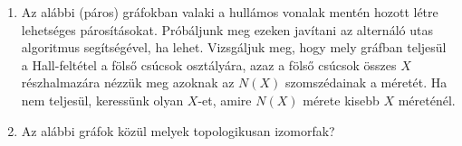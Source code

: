 \documentclass[a4paper, 12pt]{article}
\begin{document}
\begin{enumerate}
            \hrule
            \item Az alábbi (páros) gráfokban valaki a hullámos vonalak mentén hozott létre lehetséges párosításokat. Próbáljunk meg ezeken javítani az alternáló utas algoritmus segítségével, ha lehet. Vizsgáljuk meg, hogy mely gráfban teljesül a Hall-feltétel a fölső csúcsok osztályára, azaz a fölső csúcsok összes $X$ részhalmazára nézzük meg azoknak az $N(X)$ szomszédainak a méretét. Ha nem teljesül, keressünk olyan $X$-et, amire $N(X)$ mérete kisebb $X$ méreténél.
            \begin{figure}[ht]
                \centering
                \begin{subfigure}{0.3\textwidth}
                    \centering
                    
                \end{subfigure}
                \begin{subfigure}{0.3\textwidth}
                    \centering
                    
                \end{subfigure}
                \begin{subfigure}{0.3\textwidth}
                    \centering
                    
                \end{subfigure}
            \end{figure}
            \item Az alábbi gráfok közül melyek topologikusan izomorfak?
			\begin{figure}[!ht]
				\centering
				\begin{subfigure}{0.15\textwidth}
					\centering
					
					\caption{}
				\end{subfigure}
				\begin{subfigure}{0.15\textwidth}
					\centering
					
					\caption{}
				\end{subfigure}
				\begin{subfigure}{0.15\textwidth}
					\centering
					
					\caption{}
				\end{subfigure}
				\begin{subfigure}{0.15\textwidth}
					\centering
					
					\caption{}
				\end{subfigure}
				\begin{subfigure}{0.15\textwidth}
					\centering
					
					\caption{}
				\end{subfigure}
				\begin{subfigure}{0.15\textwidth}
					\centering
					
					\caption{}
				\end{subfigure}
			\end{figure}
                

\end{enumerate}
\end{document}
